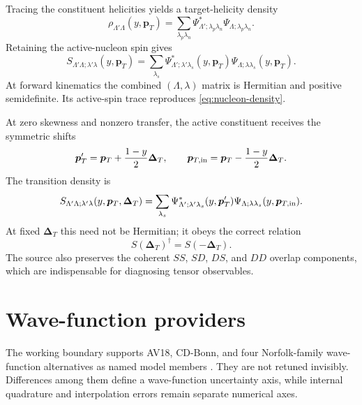 \documentclass[11pt,oneside]{book}
\newcommand{\pT}{\bm{p}_{T}}
\newcommand{\DeltaT}{\bm{\Delta}_{T}}
\begin{document}
Tracing the constituent helicities yields a target-helicity density
\begin{equation}
 \rho_{\Lambda'\Lambda}(y,\pT)
 =\sum_{\lambda_p\lambda_n}
 \Psi^*_{\Lambda';\lambda_p\lambda_n}
 \Psi_{\Lambda;\lambda_p\lambda_n}.
 \label{eq:nucleon-density}
\end{equation}
Retaining the active-nucleon spin gives
\begin{equation}
 S_{\Lambda'\Lambda;\lambda'\lambda}(y,\pT)
 =\sum_{\lambda_s}
 \Psi^*_{\Lambda';\lambda'\lambda_s}(y,\pT)
 \Psi_{\Lambda;\lambda\lambda_s}(y,\pT).
 \label{eq:active-density}
\end{equation}
At forward kinematics the combined $(\Lambda,\lambda)$ matrix is Hermitian and positive semidefinite.  Its active-spin trace reproduces \cref{eq:nucleon-density}.

At zero skewness and nonzero transfer, the active constituent receives the symmetric shifts
\begin{equation}
 \pT' =\pT+\frac{1-y}{2}\DeltaT,
 \qquad
 \bm p_{T,\rm in}=\pT-\frac{1-y}{2}\DeltaT.
 \label{eq:offforward-shifts}
\end{equation}
The transition density is
\begin{equation}
 S_{\Lambda'\Lambda;\lambda'\lambda}(y,\pT,\DeltaT)
 =\sum_{\lambda_s}
 \Psi^*_{\Lambda';\lambda'\lambda_s}(y,\pT')
 \Psi_{\Lambda;\lambda\lambda_s}(y,\bm p_{T,\rm in}).
 \label{eq:offforward-density}
\end{equation}
At fixed $\DeltaT$ this need not be Hermitian; it obeys the correct relation
\begin{equation}
 S(\DeltaT)^\dagger=S(-\DeltaT).
 \label{eq:offforward-hermiticity}
\end{equation}
The source also preserves the coherent $SS$, $SD$, $DS$, and $DD$ overlap components, which are indispensable for diagnosing tensor observables.

\section{Wave-function providers}

The working boundary supports AV18, CD-Bonn, and four Norfolk-family wave-function alternatives as named model members \cite{WiringaStoksSchiavilla1995,Machleidt2001,Piarulli2016}.  They are not retuned invisibly.  Differences among them define a wave-function uncertainty axis, while internal quadrature and interpolation errors remain separate numerical axes.
\end{document}
